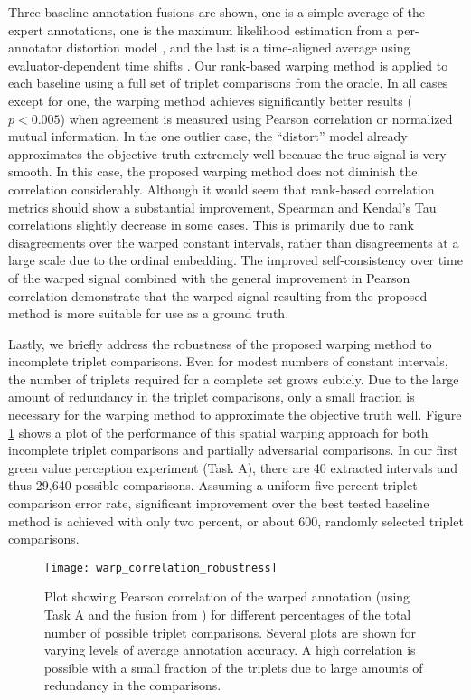 \documentclass[times,twocolumn,final,authoryear]{elsarticle}
\begin{document}
Three baseline annotation fusions are shown, one is a simple average of the expert annotations, one is the maximum likelihood estimation from a per-annotator distortion model \citep{Gupta2016}, and the last is a time-aligned average using evaluator-dependent time shifts \citep{Mariooryad2015}.  Our rank-based warping method is applied to each baseline using a full set of triplet comparisons from the oracle.  In all cases except for one, the warping method achieves significantly better results ($p<0.005$) when agreement is measured using Pearson correlation or normalized mutual information.  In the one outlier case, the ``distort'' model already approximates the objective truth extremely well because the true signal is very smooth.  In this case, the proposed warping method does not diminish the correlation considerably.  Although it would seem that rank-based correlation metrics should show a substantial improvement, Spearman and Kendal's Tau correlations slightly decrease in some cases.  This is primarily due to rank disagreements over the warped constant intervals, rather than disagreements at a large scale due to the ordinal embedding.  The improved self-consistency over time of the warped signal combined with the general improvement in Pearson correlation demonstrate that the warped signal resulting from the proposed method is more suitable for use as a ground truth.

Lastly, we briefly address the robustness of the proposed warping method to incomplete triplet comparisons. Even for modest numbers of constant intervals, the number of triplets required for a complete set grows cubicly.  Due to the large amount of redundancy in the triplet comparisons, only a small fraction is necessary for the warping method to approximate the objective truth well.  Figure \ref{fig:warp_correlation_robustness} shows a plot of the performance of this spatial warping approach for both incomplete triplet comparisons and partially adversarial comparisons.  In our first green value perception experiment (Task A), there are 40 extracted intervals and thus 29,640 possible comparisons.  Assuming a uniform five percent triplet comparison error rate, significant improvement over the best tested baseline method is achieved with only two percent, or about 600, randomly selected triplet comparisons.

\begin{figure}
	\centering
	\texttt{[image: warp\_correlation\_robustness]}
	\caption{Plot showing Pearson correlation of the warped annotation (using Task A and the fusion from \cite{Mariooryad2015}) for different percentages of the total number of possible triplet comparisons.  Several plots are shown for varying levels of average annotation accuracy.  A high correlation is possible with a small fraction of the triplets due to large amounts of redundancy in the comparisons.}
	\label{fig:warp_correlation_robustness}
\end{figure}
\end{document}
